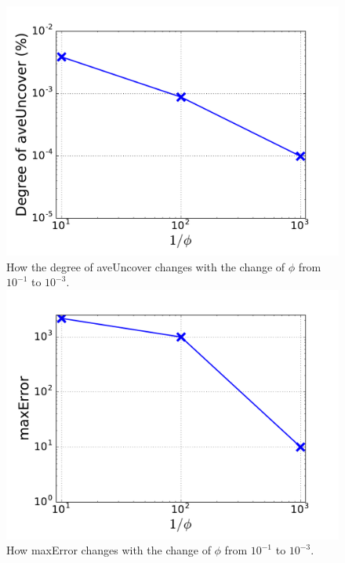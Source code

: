 \begin{figure}[!htb]

%
  \includegraphics[width=\linewidth]{figure/aveUncover.pdf}
  {How the degree of aveUncover changes with the change of $\phi$ from $10^{-1}$ to $10^{-3}$.}
\endminipage\hfill
{}%
  \includegraphics[width=\linewidth]{figure/maxError.pdf}
  {How maxError changes with the change of $\phi$ from $10^{-1}$ to $10^{-3}$.}


\end{figure}

